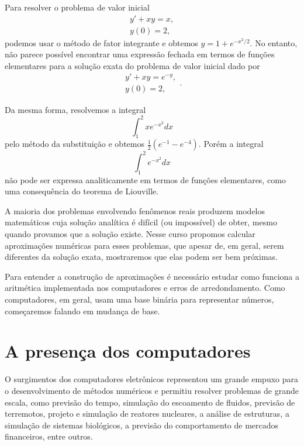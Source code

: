 Para resolver o problema de valor inicial
\begin{equation}
\begin{array}{l}
y'+xy=x,\\
y(0)=2,
\end{array}
\end{equation}
podemos usar o método de fator integrante e obtemos $y=1+e^{-x^2/2}$. No entanto, não parece possível  encontrar uma expressão fechada em termos de funções elementares para a solução exata do problema de valor inicial dado por
\begin{equation}
\begin{array}{l}
y'+xy=e^{-y},\\
y(0)=2,
\end{array}.
\end{equation}


Da mesma forma, resolvemos a integral
\begin{equation}
\int_1^2xe^{-x^2}dx
\end{equation}
pelo método da substituição e obtemos $\frac{1}{2}(e^{-1}-e^{-4})$. Porém a integral
\begin{equation}
\int_1^2 e^{-x^2} dx
\end{equation}
não pode ser expressa analiticamente em termos de funções elementares, como uma consequência do teorema de Liouville.

A maioria dos problemas envolvendo fenômenos reais produzem modelos matemáticos cuja solução analítica é difícil (ou impossível) de obter, mesmo quando provamos que a solução existe. Nesse curso propomos calcular aproximações numéricas para esses problemas, que apesar de, em geral, serem diferentes da solução exata, mostraremos que elas podem ser bem próximas.

Para entender a construção de aproximações é necessário estudar como funciona a aritmética implementada nos computadores e erros de arredondamento. Como computadores, em geral, usam uma base binária para representar números, começaremos falando em mudança de base.


\section{A presença dos computadores}
O surgimentos dos computadores eletrônicos representou um grande empuxo para o desenvolvimento de métodos numéricos e permitiu resolver problemas de grande escala, como previsão do tempo, simulação do escoamento de fluidos, previsão de terremotos, projeto e simulação de reatores nucleares, a análise de estruturas, a simulação de sistemas biológicos, a previsão do comportamento de mercados financeiros, entre outros.


